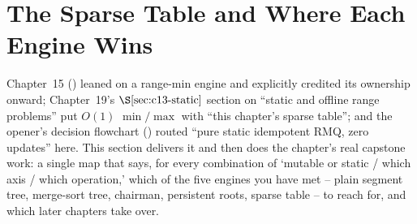 \section{The Sparse Table and Where Each Engine Wins}\label{sec:c19-sparse}

\begin{previouslybox}
Chapter~15 () leaned on a range-min engine and explicitly credited its ownership onward; Chapter~19's \(\secref{c13-static}\) section on ``static and offline range problems'' put \(O(1)\) \(\min/\max\) with ``this chapter's sparse table''; and the opener's decision flowchart () routed ``pure static idempotent RMQ, zero updates'' here. This section delivers it and then does the chapter's real capstone work: a single map that says, for every combination of `mutable or static / which axis / which operation,' which of the five engines you have met -- plain segment tree, merge-sort tree, chairman, persistent roots, sparse table -- to reach for, and which later chapters take over.
\end{previouslybox}

